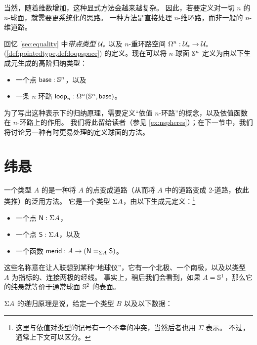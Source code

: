 %

当然，随着维数增加，这种显式方法会越来越复杂。
因此，若要定义对一切 $n$ 的 $n$-球面，就需要更系统化的思路。
一种方法是直接处理 $n$-维环路，而非一般的 $n$-维道路。

%
回忆 \cref{sec:equality} 中\emph{带点类型} $\type_*$ 以及 $n$-重环路空间 $\Omega^n : \type_* \to \type_*$ (\cref{def:pointedtype,def:loopspace}) 的定义。现在可以将 $n$-球面 $\Sn^n$ 定义为由以下生成元生成的高阶归纳类型：
%


\begin{itemize}
\item 一个点 $\base:\Sn^n$，以及
\item 一条 $n$-环路 $\lloop_n : \Omega^n(\Sn^n,\base)$。
\end{itemize}


为了写出这种表示下的归纳原理，需要定义``依值 $n$-环路''的概念，以及依值函数在 $n$-环路上的作用。
我们将此留给读者（参见 \cref{ex:nspheres}）；在下一节中，我们将讨论另一种有时更易处理的定义球面的方法。

\section{纬悬}
\label{sec:suspension}

%
%
一个类型 $A$ 的是一种将 $A$ 的点变成道路（从而将 $A$ 中的道路变成 2-道路，依此类推）的泛用方法。
它是一个类型 $\susp A$，由以下生成元定义：\footnote{这里与依值对类型的记号有一个不幸的冲突，当然后者也用 $\Sigma$ 表示。
  不过，通常上下文可以区分。}


\begin{itemize}
\item 一个点 $\north:\susp A$，
\item 一个点 $\south:\susp A$，以及
\item 一个函数 $\merid:A \to (\id[\susp A]\north\south)$。
\end{itemize}

这些名称意在让人联想到某种``地球仪''，它有一个北极、一个南极，以及以类型 $A$ 为指标的、连接两极的经线。
%
%
事实上，稍后我们会看到，如果 $A=\Sn^1$，那么它的纬悬就等价于通常球面 $\Sn^2$ 的表面。

%
$\susp A$ 的递归原理是说，给定一个类型 $B$ 以及以下数据：

